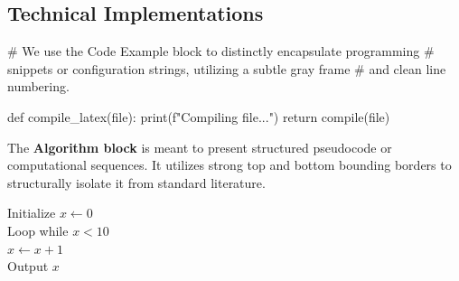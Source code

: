 \subsection{Technical Implementations}

\begin{codeexample}[language=Python]
# We use the Code Example block to distinctly encapsulate programming 
# snippets or configuration strings, utilizing a subtle gray frame 
# and clean line numbering.

def compile_latex(file):
    print(f"Compiling {file}...")
    return compile(file)
\end{codeexample}

\begin{algorithm}
The \textbf{Algorithm block} is meant to present structured pseudocode or computational sequences. It utilizes strong top and bottom bounding borders to structurally isolate it from standard literature.

Initialize $x \gets 0$ \\
Loop while $x \lt 10$ \\
\quad $x \gets x + 1$ \\
Output $x$
\end{algorithm}
